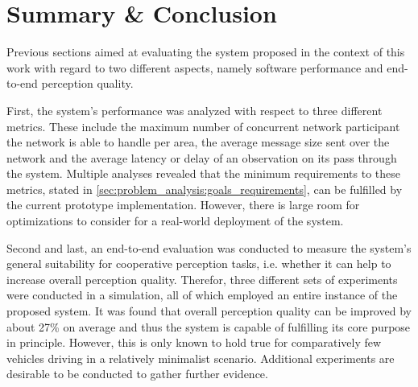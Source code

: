\section{Summary \& Conclusion}
\label{sec:evaluation:summary_conclusion}
Previous sections aimed at evaluating the system proposed in the context of this work with regard to two different aspects, namely software performance and end-to-end perception quality. 

First, the system's performance was analyzed with respect to three different metrics. These include the maximum number of concurrent network participant the network is able to handle per area, the average message size sent over the network and the average latency or delay of an observation on its pass through the system. Multiple analyses revealed that the minimum requirements to these metrics, stated in \cref{sec:problem_analysis:goals_requirements}, can be fulfilled by the current prototype implementation. However, there is large room for optimizations to consider for a real-world deployment of the system.

Second and last, an end-to-end evaluation was conducted to measure the system's general suitability for cooperative perception tasks, i.e. whether it can help to increase overall perception quality. Therefor, three different sets of experiments were conducted in a simulation, all of which employed an entire instance of the proposed system. It was found that overall perception quality can be improved by about 27\% on  average and thus the system is capable of fulfilling its core purpose in principle. However, this is only known to hold true for comparatively few vehicles driving in a relatively minimalist scenario. Additional experiments are desirable to be conducted to gather further evidence. 
